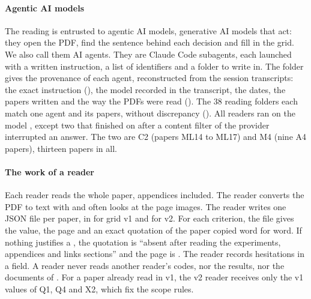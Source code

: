 \paragraph{Agentic AI models}
The reading is entrusted to agentic AI models, generative AI models that act: they open the PDF, find the sentence behind each decision and fill in the grid. We also call them AI agents. They are Claude Code subagents, each launched with a written
instruction, a list of identifiers and a folder to write in. The folder  gives the
provenance of each agent, reconstructed from the session transcripts: the exact instruction (), the model recorded in the transcript, the
dates, the papers written and the way the PDFs were read (). The 38 reading folders
each match one agent and its papers, without discrepancy (). All readers ran
on the model , except two that finished on  after a content
filter of the provider interrupted an answer. The two are C2 (papers ML14 to ML17) and M4 (nine A4
papers), thirteen papers in all.

\paragraph{The work of a reader}
Each reader reads the whole paper, appendices included. The reader converts the PDF to text with
 and often looks at the page images. The reader writes one JSON file per paper, in
 for grid v1 and  for v2. For each
criterion, the file gives the value, the page and an exact quotation of the paper copied word for
word. If nothing justifies a , the quotation is \enquote{absent after reading the
experiments, appendices and links sections} and the page is . The reader records hesitations
in a  field. A reader never reads another reader's codes, nor the results, nor the
documents of . For a paper already read in v1, the v2 reader receives only the v1 values of
Q1, Q4 and X2, which fix the scope rules.

